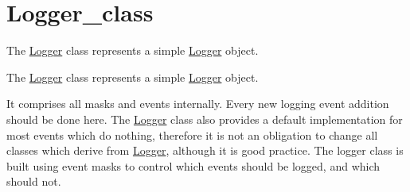 \hypertarget{group__logger__class}{}\section{Logger\+\_\+class}
\label{group__logger__class}


The \hyperlink{classgko_1_1log_1_1Logger}{Logger} class represents a simple \hyperlink{classgko_1_1log_1_1Logger}{Logger} object.  


The \hyperlink{classgko_1_1log_1_1Logger}{Logger} class represents a simple \hyperlink{classgko_1_1log_1_1Logger}{Logger} object. 

It comprises all masks and events internally. Every new logging event addition should be done here. The \hyperlink{classgko_1_1log_1_1Logger}{Logger} class also provides a default implementation for most events which do nothing, therefore it is not an obligation to change all classes which derive from \hyperlink{classgko_1_1log_1_1Logger}{Logger}, although it is good practice. The logger class is built using event masks to control which events should be logged, and which should not. 